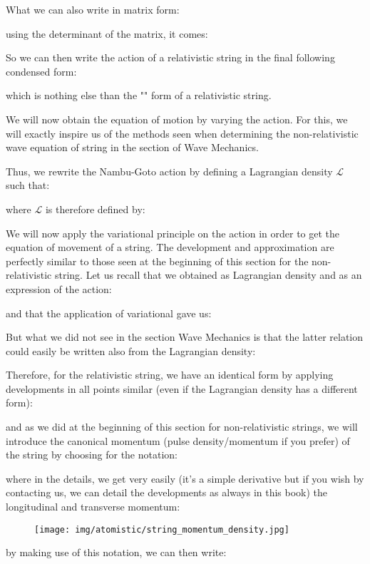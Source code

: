 	What we can also write in matrix form:
	
	using the determinant of the matrix, it comes:
	
	So we can then write the action of a relativistic string in the final following condensed form:
	
	which is nothing else than the "" form of a relativistic string.
	
	We will now obtain the equation of motion by varying the action. For this, we will exactly inspire us of the methods seen when determining the non-relativistic wave equation of string in the section of Wave Mechanics.

	Thus, we rewrite the Nambu-Goto action by defining a Lagrangian density $\mathcal{L}$ such that:
	
	where $\mathcal{L}$ is therefore defined by:
	
	We will now apply the variational principle on the action in order to get the equation of movement of a string. The development and approximation are perfectly similar to those seen at the beginning of this section for the non-relativistic string. Let us recall that we obtained as Lagrangian density and as an expression of the action:
	
	and that the application of variational gave us:
	
	But what we did not see in the section Wave Mechanics is that the latter relation could easily be written also from the Lagrangian density:
	
	Therefore, for the relativistic string, we have an identical form by applying developments in all points similar (even if the Lagrangian density has a different form):
	
	and as we did at the beginning of this section for non-relativistic strings, we will introduce the canonical momentum (pulse density/momentum if you prefer) of the string by choosing for the notation:
	
	where in the details, we get very easily (it's a simple derivative but if you wish by contacting us, we can detail the developments as always in this book) the longitudinal and transverse momentum:
	
	\begin{figure}[H]
		\centering
		\texttt{[image: img/atomistic/string\_momentum\_density.jpg]}	
	\end{figure}
	by making use of this notation, we can then write:
	
